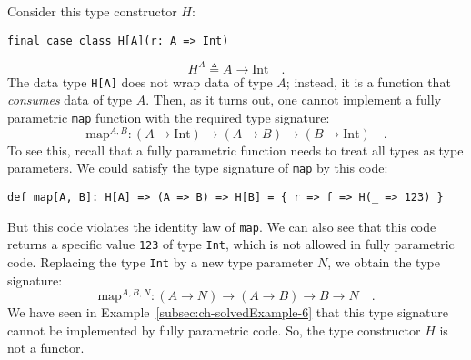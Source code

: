 Consider this type constructor $H$:
\begin{lstlisting}
final case class H[A](r: A => Int)
\end{lstlisting}
\[
H^{A}\triangleq A\rightarrow\text{Int}\quad.
\]
The data type \lstinline!H[A]! does not wrap data of type $A$; instead,
it is a function that \emph{consumes} data of type $A$. Then, as
it turns out, one cannot implement a fully parametric \lstinline!map!
function with the required type signature:
\[
\text{map}^{A,B}:\left(A\rightarrow\text{Int}\right)\rightarrow\left(A\rightarrow B\right)\rightarrow\left(B\rightarrow\text{Int}\right)\quad.
\]
To see this, recall that a fully
parametric function needs to treat all types as type parameters. We
could satisfy the type signature of \lstinline!map! by this code:
\begin{lstlisting}
def map[A, B]: H[A] => (A => B) => H[B] = { r => f => H(_ => 123) }
\end{lstlisting}
But this code violates the identity law of \lstinline!map!. We can
also see that this code returns a specific value \lstinline!123!
of type \lstinline!Int!, which is not allowed in fully parametric
code. Replacing the type \lstinline!Int! by a new type parameter
$N$, we obtain the type signature:
\[
\text{map}^{A,B,N}:\left(A\rightarrow N\right)\rightarrow\left(A\rightarrow B\right)\rightarrow B\rightarrow N\quad.
\]
We have seen in Example~\ref{subsec:ch-solvedExample-6} that this
type signature cannot be implemented by fully parametric code. So,
the type constructor $H$ is not a functor.

